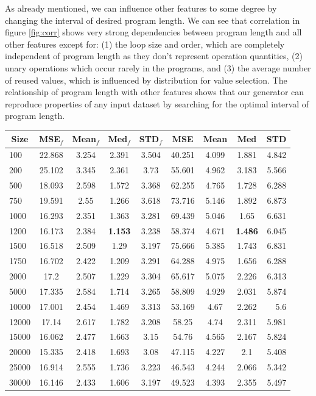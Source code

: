 \documentclass[sigplan,\review anonymous]{acmart}
\newcommand*{\thead}[1]{\multicolumn{1}{c}{\bfseries #1}}
\begin{document}
As already mentioned, we can influence other features to some degree by
changing the interval of desired program length. We can see that correlation
in figure \ref{fig:corr} shows very strong dependencies between program length
and all other features except for: (1) the loop size and order, which are
completely independent of program length as they don't represent operation
quantities, (2) unary operations which occur rarely in the programs, and (3)
the average number of reused values, which is influenced by distribution for
value selection. The relationship of program length with other features shows
that our generator can reproduce properties of any input dataset by searching
for the optimal interval of program length.

\begin{center}
  \begin{tabular}{ l c c c c c c c r }
  \hline
  \thead{Size} & \thead{MSE$_f$} & \thead{Mean$_f$} & \thead{Med$_f$} &
  \thead{STD$_f$} & \thead{MSE} & \thead{Mean} & \thead{Med} &
  \thead{STD}\\
  \hline
  100 & 22.868 & 3.254 & 2.391 & 3.504 & 40.251 & 4.099 & 1.881 & 4.842\\
  200 & 25.102 & 3.345 & 2.361 & 3.73 & 55.601 & 4.962 & 3.183 & 5.566\\
  500 & 18.093 & 2.598 & 1.572 & 3.368 & 62.255 & 4.765 & 1.728 & 6.288\\
  750 & 19.591 & 2.55 & 1.266 & 3.618 & 73.716 & 5.146 & 1.892 & 6.873\\
  1000 & 16.293 & 2.351 & 1.363 & 3.281 & 69.439 & 5.046 & 1.65 & 6.631\\
  \rowcolor{lightgray} 1200 & 16.173 & 2.384 & \textbf{1.153} & 3.238 & 58.374 & 4.671 & \textbf{1.486} & 6.045\\
  1500 & 16.518 & 2.509 & 1.29 & 3.197 & 75.666 & 5.385 & 1.743 & 6.831\\
  1750 & 16.702 & 2.422 & 1.209 & 3.291 & 64.288 & 4.975 & 1.656 & 6.288\\
  2000 & 17.2 & 2.507 & 1.229 & 3.304 & 65.617 & 5.075 & 2.226 & 6.313\\
  5000 & 17.335 & 2.584 & 1.714 & 3.265 & 58.809 & 4.929 & 2.031 & 5.874\\
  10000 & 17.001 & 2.454 & 1.469 & 3.313 & 53.169 & 4.67 & 2.262 & 5.6\\
  12000 & 17.14 & 2.617 & 1.782 & 3.208 & 58.25 & 4.74 & 2.311 & 5.981\\
  15000 & 16.062 & 2.477 & 1.663 & 3.15 & 54.76 & 4.565 & 2.167 & 5.824\\
  20000 & 15.335 & 2.418 & 1.693 & 3.08 & 47.115 & 4.227 & 2.1 & 5.408\\
  25000 & 16.914 & 2.555 & 1.736 & 3.223 & 46.543 & 4.244 & 2.066 & 5.342\\
  30000 & 16.146 & 2.433 & 1.606 & 3.197 & 49.523 & 4.393 & 2.355 & 5.497\\
  \hline
  \end{tabular}
  \label{tab:gbt_search_size}
\end{center}
\end{document}

